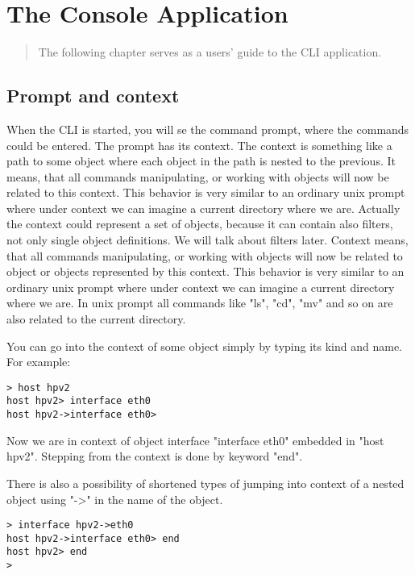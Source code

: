 \documentclass[deska]{subfiles}
\begin{document}
\chapter{The Console Application}
\label{sec:usage-cli}

\begin{abstract}
The following chapter serves as a users' guide to the CLI application.
\end{abstract}

\section{Prompt and context}

When the CLI is started, you will se the command prompt, where the commands could be entered. The prompt has its context.
The context is something like a path to some object where each object in the path is nested to the previous. 
It means, that all commands manipulating, or working with objects will now be related to this context. This behavior
is very similar to an ordinary unix prompt where under context we can imagine a current directory where we are. Actually the
context could represent a set of objects, because it can contain also filters, not only single object definitions.
We will talk about filters later. Context means, that all commands manipulating, or working with objects will now be related to
object or objects represented by this context. This behavior is very similar to an ordinary unix prompt where under context
we can imagine a current directory where we are. In unix prompt all commands like "ls", "cd", "mv" and so on are also related
to the current directory.

You can go into the context of some object simply by typing its kind and name. For example:

\begin{verbatim}
> host hpv2
host hpv2> interface eth0
host hpv2->interface eth0>
\end{verbatim}

Now we are in context of object interface "interface eth0" embedded in "host hpv2". Stepping from the context is done by
keyword "end".

There is also a possibility of shortened types of jumping into context of a nested object using "->" in the name of the
object.

\begin{verbatim}
> interface hpv2->eth0
host hpv2->interface eth0> end
host hpv2> end
>
\end{verbatim}
\end{document}
